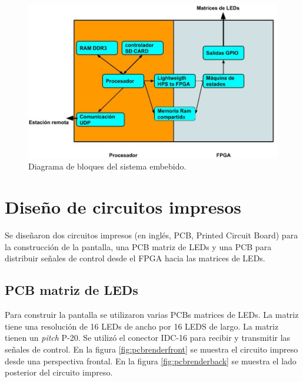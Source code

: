 \begin{figure}[htpb]
	\centering
	\includegraphics[scale=1.8]{Figures/Diagramabloques.jpg} 
	\caption{Diagrama de bloques del sistema embebido.}
	\label{fig:bloques embebido}
\end{figure}






\section{ Diseño de circuitos impresos}
Se diseñaron dos circuitos impresos (en inglés, PCB, Printed Circuit Board) para la construcción de la pantalla, una PCB matriz de LEDs y una PCB para distribuir señales de control desde el FPGA hacia las matrices de LEDs.
\subsection{PCB matriz de LEDs}
Para construir la pantalla se utilizaron varias PCBs matrices de LEDs. La matriz  tiene una resolución de 16 LEDs de ancho por 16 LEDS de largo. La matriz tienen un \textit{pitch} P-20. Se utilizó el conector IDC-16 para recibir y transmitir las señales de control. En la figura \ref{fig:pcbrenderfront}  se muestra el circuito impreso desde una perspectiva frontal. En la figura \ref{fig:pcbrenderback} se muestra el lado posterior del circuito impreso.


